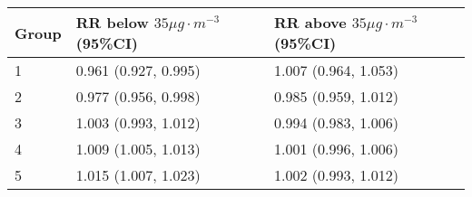 \begin{tabular}{lll}
  \hline
Group & RR below $35 \mu g \cdot m^{-3}$ (95\%CI) & RR above $35 \mu g \cdot m^{-3}$ (95\%CI) \\ 
  \hline
   1 & 0.961 (0.927, 0.995) & 1.007 (0.964, 1.053) \\ 
     2 & 0.977 (0.956, 0.998) & 0.985 (0.959, 1.012) \\ 
     3 & 1.003 (0.993, 1.012) & 0.994 (0.983, 1.006) \\ 
     4 & 1.009 (1.005, 1.013) & 1.001 (0.996, 1.006) \\ 
     5 & 1.015 (1.007, 1.023) & 1.002 (0.993, 1.012) \\ 
   \hline
\end{tabular}

